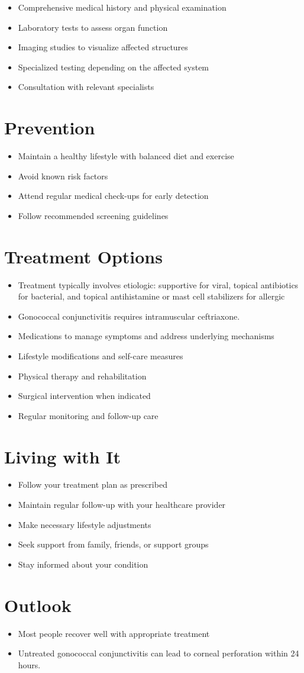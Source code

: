 \begin{itemize}[noitemsep]
  \item Comprehensive medical history and physical examination
  \item Laboratory tests to assess organ function
  \item Imaging studies to visualize affected structures
  \item Specialized testing depending on the affected system
  \item Consultation with relevant specialists
\end{itemize}
\section{Prevention}
\begin{itemize}[noitemsep]
  \item Maintain a healthy lifestyle with balanced diet and exercise
  \item Avoid known risk factors
  \item Attend regular medical check-ups for early detection
  \item Follow recommended screening guidelines
\end{itemize}
\section{Treatment Options}
\begin{itemize}[noitemsep]
  \item Treatment typically involves etiologic: supportive for viral, topical antibiotics for bacterial, and topical antihistamine or mast cell stabilizers for allergic
  \item Gonococcal conjunctivitis requires intramuscular ceftriaxone.
  \item Medications to manage symptoms and address underlying mechanisms
  \item Lifestyle modifications and self-care measures
  \item Physical therapy and rehabilitation
  \item Surgical intervention when indicated
  \item Regular monitoring and follow-up care
\end{itemize}
\section{Living with It}
\begin{itemize}[noitemsep]
  \item Follow your treatment plan as prescribed
  \item Maintain regular follow-up with your healthcare provider
  \item Make necessary lifestyle adjustments
  \item Seek support from family, friends, or support groups
  \item Stay informed about your condition
\end{itemize}
\section{Outlook}
\begin{itemize}[noitemsep]
  \item Most people recover well with appropriate treatment
  \item Untreated gonococcal conjunctivitis can lead to corneal perforation within 24 hours.
\end{itemize}
